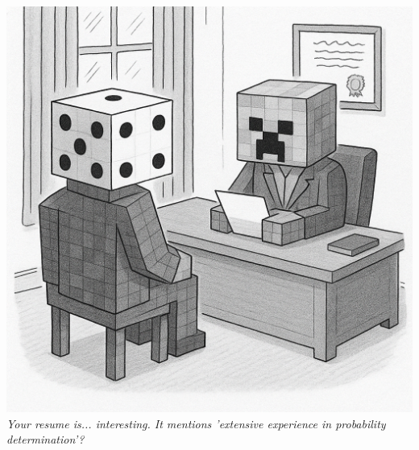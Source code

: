 \vspace{2em}
\begin{center}
    \includegraphics[height=20\baselineskip]{22_MinecraftCreeper/ChatGPT Image Apr 21, 2025, 08_04_30 PM.png}\\
    {\small\textit{Your resume is... interesting. It mentions 'extensive experience in probability determination'?}}
\end{center}
